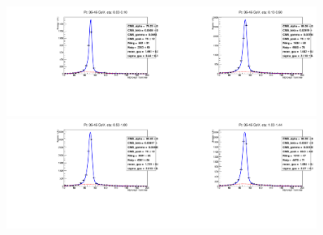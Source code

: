 \begin{figure}[htb]
  \begin{center}
   \includegraphics[width=0.45\textwidth]{../figs/figs_v11/ELECTRON_WGamma/EtoGammaFits/sa_hZmass_h_Data_EtoGamma_Enr_BARREL_pt35to45_ieta0.pdf}\includegraphics[width=0.45\textwidth]{../figs/figs_v11/ELECTRON_WGamma/EtoGammaFits/sa_hZmass_h_Data_EtoGamma_Enr_BARREL_pt35to45_ieta1.pdf}\\
   \includegraphics[width=0.45\textwidth]{../figs/figs_v11/ELECTRON_WGamma/EtoGammaFits/sa_hZmass_h_Data_EtoGamma_Enr_BARREL_pt35to45_ieta2.pdf}\includegraphics[width=0.45\textwidth]{../figs/figs_v11/ELECTRON_WGamma/EtoGammaFits/sa_hZmass_h_Data_EtoGamma_Enr_BARREL_pt35to45_ieta3.pdf}\\

\end{center}
\end{figure}
